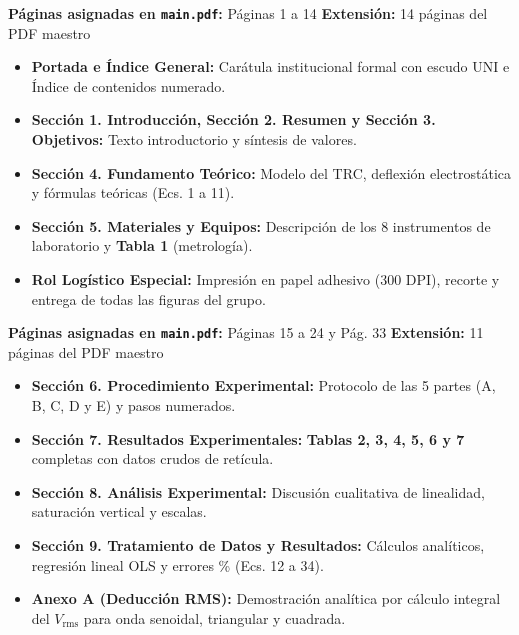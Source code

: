 \documentclass[a4paper, 10pt]{article}
\begin{document}
\vspace{0.05cm}

\begin{tcolorbox}[title=BLOQUE 1 — Asignado a: Jesús Rodolfo Vera Vivanco, colframe=uni-blue]
    \footnotesize
    \textbf{Páginas asignadas en \texttt{main.pdf}:} Páginas 1 a 14 \hfill \textbf{Extensión:} 14 páginas del PDF maestro
    \begin{itemize}[leftmargin=1.5em, itemsep=1.2pt, topsep=1pt]
        \item \textbf{Portada e Índice General:} Carátula institucional formal con escudo UNI e Índice de contenidos numerado.
        \item \textbf{Sección 1. Introducción, Sección 2. Resumen y Sección 3. Objetivos:} Texto introductorio y síntesis de valores.
        \item \textbf{Sección 4. Fundamento Teórico:} Modelo del TRC, deflexión electrostática y fórmulas teóricas (Ecs. 1 a 11).
        \item \textbf{Sección 5. Materiales y Equipos:} Descripción de los 8 instrumentos de laboratorio y \textbf{Tabla 1} (metrología).
        \item \textbf{Rol Logístico Especial:} Impresión en papel adhesivo (300 DPI), recorte y entrega de todas las figuras del grupo.
    \end{itemize}
\end{tcolorbox}

\vspace{0.05cm}

\begin{tcolorbox}[title=BLOQUE 2 — Asignado a: Gerald Giordano Casañe Ramírez, colframe=box-green]
    \footnotesize
    \textbf{Páginas asignadas en \texttt{main.pdf}:} Páginas 15 a 24 y Pág. 33 \hfill \textbf{Extensión:} 11 páginas del PDF maestro
    \begin{itemize}[leftmargin=1.5em, itemsep=1.2pt, topsep=1pt]
        \item \textbf{Sección 6. Procedimiento Experimental:} Protocolo de las 5 partes (A, B, C, D y E) y pasos numerados.
        \item \textbf{Sección 7. Resultados Experimentales:} \textbf{Tablas 2, 3, 4, 5, 6 y 7} completas con datos crudos de retícula.
        \item \textbf{Sección 8. Análisis Experimental:} Discusión cualitativa de linealidad, saturación vertical y escalas.
        \item \textbf{Sección 9. Tratamiento de Datos y Resultados:} Cálculos analíticos, regresión lineal OLS y errores \% (Ecs. 12 a 34).
        \item \textbf{Anexo A (Deducción RMS):} Demostración analítica por cálculo integral del $V_{\text{rms}}$ para onda senoidal, triangular y cuadrada.
    \end{itemize}
\end{tcolorbox}
\end{document}
